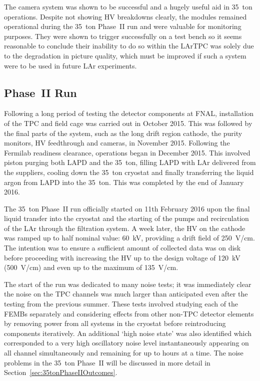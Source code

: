 The camera system was shown to be successful and a hugely useful aid in 35~ton operations.  Despite not showing HV breakdowns clearly, the modules remained operational during the 35~ton Phase~II run and were valuable for monitoring purposes.  They were shown to trigger successfully on a test bench so it seems reasonable to conclude their inability to do so within the LArTPC was solely due to the degradation in picture quality, which must be improved if such a system were to be used in future LAr experiments.

\subsection{Phase~II Run}\label{sec:35tonPhaseIIRun}

Following a long period of testing the detector components at FNAL, installation of the TPC and field cage was carried out in October 2015.  This was followed by the final parts of the system, such as the long drift region cathode, the purity monitors, HV feedthrough and cameras, in November 2015.  Following the Fermilab readiness clearance, operations began in December 2015.  This involved piston purging both LAPD and the 35~ton, filling LAPD with LAr delivered from the suppliers, cooling down the 35~ton cryostat and finally transferring the liquid argon from LAPD into the 35~ton.  This was completed by the end of January 2016.

The 35~ton Phase~II run officially started on 11th February 2016 upon the final liquid transfer into the cryostat and the starting of the pumps and recirculation of the LAr through the filtration system.  A week later, the HV on the cathode was ramped up to half nominal value: 60~kV, providing a drift field of 250~V/cm.  The intention was to ensure a sufficient amount of collected data was on disk before proceeding with increasing the HV up to the design voltage of 120~kV (500~V/cm) and even up to the maximum of 135~V/cm.

The start of the run was dedicated to many noise tests; it was immediately clear the noise on the TPC channels was much larger than anticipated even after the testing from the previous summer.  These tests involved studying each of the FEMBs separately and considering effects from other non-TPC detector elements by removing power from all systems in the cryostat before reintroducing components iteratively.  An additional `high noise state' was also identified which corresponded to a very high oscillatory noise level instantaneously appearing on all channel simultaneously and remaining for up to hours at a time.  The noise problems in the 35~ton Phase~II will be discussed in more detail in Section~\ref{sec:35tonPhaseIIOutcomes}.

